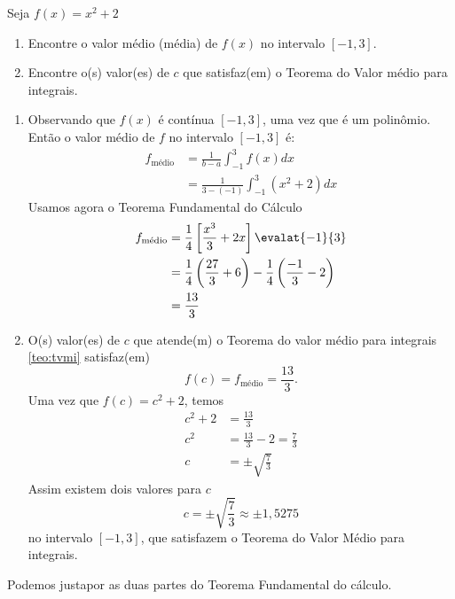 \begin{example}
Seja $f(x)= x^2+2$
\begin{enumerate}[label=\alph*)]
  \item Encontre o valor médio (média) de $f(x)$ no intervalo $[-1, 3]$.
  \item Encontre o(s) valor(es) de $c$ que satisfaz(em)
        o Teorema do Valor médio para integrais.
\end{enumerate}
\solution
\begin{enumerate}[label=\alph*)]
  \item Observando que $f(x)$ é contínua $[-1, 3]$, uma vez que é um polinômio.
    Então o valor médio de $f$ no intervalo $[-1, 3]$ é:
    \begin{align*}
      f_{\textrm{médio}}
      & = \frac{1}{b-a}\int_{-1}^{3} f(x)dx \\
      & = \frac{1}{3-(-1)}\int_{-1}^{3} (x^2+2)dx
    \end{align*}
    Usamos agora o Teorema Fundamental do Cálculo
    \begin{align*}
      f_{\textrm{médio}}
      & = \frac{1}{4}\left[ \frac{x^3}{3}+2x\right] \evalat{-1}{3} \\
      & = \frac{1}{4}\left( \frac{27}{3}+6\right)
        - \frac{1}{4}\left( \frac{-1}{3}-2\right) \\
      & = \frac{13}{3}
    \end{align*}

  \item O(s) valor(es) de $c$ que atende(m) o Teorema do valor médio para
    integrais \ref{teo:tvmi} satisfaz(em)
    \[
      f(c) = f_{\textrm{médio}}= \frac{13}{3}.
    \]
    Uma vez que $f(c)= c^2+2$, temos
    \begin{align*}
      c^2+2 & = \frac{13}{3}                 \\
      c^2   & = \frac{13}{3}-2 = \frac{7}{3} \\
      c     & = \pm \sqrt{\frac{7}{3}}
    \end{align*}
    Assim existem dois valores para $c$
    \[
      c= \pm \sqrt{\frac{7}{3}} \approx \pm 1,5275
    \]
    no intervalo $[-1, 3]$, que satisfazem o Teorema do Valor Médio para integrais.
\end{enumerate}
\end{example}

Podemos justapor as duas partes do Teorema Fundamental do cálculo.

